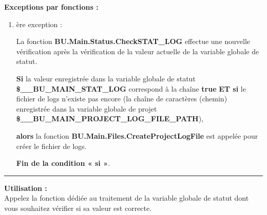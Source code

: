 \documentclass[a4paper,10pt]{article}
\begin{document}
    \begin{justify}
        \textbf{Exceptions par fonctions :}
    \end{justify}

    \begin{justify}
        \begin{enumerate}
            \item
            {
                ère exception :

                \begin{justify}
                    La fonction \textbf{\color{func}BU.Main.Status.CheckSTAT\_LOG} effectue une nouvelle vérification après la vérification de la valeur actuelle de la variable globale de statut.
                \end{justify}

                \begin{justify}
                    \textbf{\color{cond}Si} la valeur enregistrée dans la variable globale de statut \textbf{\color{vars}\$\_\_BU\_MAIN\_STAT\_LOG} correspond à la chaîne \textbf{true} \textbf{\color{cond}ET si} le fichier de logs n'existe pas encore (la chaîne de caractères (chemin) enregistrée dans la variable globale de projet \textbf{\color{vars}\$\_\_BU\_MAIN\_PROJECT\_LOG\_FILE\_PATH}),
                \end{justify}

                \begin{justify}
                    \textbf{\color{cond} alors} la fonction \textbf{\color{func}BU.Main.Files.CreateProjectLogFile} est appelée pour créer le fichier de logs.
                \end{justify}

                \begin{justify}
                    \textbf{\color{cond}Fin de la condition « si »}.
                \end{justify}
            }
        \end{enumerate}
    \end{justify}


    \par\noindent\rule{\textwidth}{0.4pt}

    \begin{justify}
        \textbf{Utilisation :}\\[1\baselineskip]
        Appelez la fonction dédiée au traitement de la variable globale de statut dont vous souhaitez vérifier si sa valeur est correcte.
    \end{justify}
\end{document}
